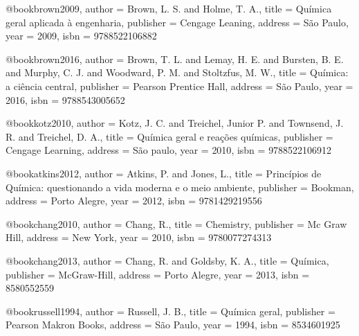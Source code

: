 %

@book{brown2009,
  author = {Brown, L. S. and Holme, T. A.},
  title = {Química geral aplicada à engenharia},
  publisher = {Cengage Leaning},
  address = {São Paulo},
  year = {2009},
  isbn = {9788522106882}
}

@book{brown2016,
  author = {Brown, T. L. and Lemay, H. E. and Bursten, B. E. and Murphy, C. J. and Woodward, P. M. and Stoltzfus, M. W.},
  title = {Química: a ciência central},
  publisher = {Pearson Prentice Hall},
  address = {São Paulo},
  year = {2016},
  isbn = {9788543005652}
}

@book{kotz2010,
  author = {Kotz, J. C. and Treichel, Junior P. and Townsend, J. R. and Treichel, D. A.},
  title = {Química geral e reações químicas},
  publisher = {Cengage Learning},
  address = {São paulo},
  year = {2010},
  isbn = {9788522106912}%
}

@book{atkins2012,
  author = {Atkins, P. and Jones, L.},
  title = {Princípios de Química: questionando a vida moderna e o meio ambiente},
  publisher = {Bookman},
  address = {Porto Alegre},
  year = {2012},
  isbn = {9781429219556}
}

@book{chang2010,
  author = {Chang, R.},
  title = {Chemistry},
  publisher = {Mc Graw Hill},
  address = {New York},
  year = {2010},
  isbn = {9780077274313}
}

@book{chang2013,
  author = {Chang, R. and Goldsby, K. A.},
  title = {Química},
  publisher = {McGraw-Hill},
  address = {Porto Alegre},
  year = {2013},
  isbn = {8580552559}
}

@book{russell1994,
  author = {Russell, J. B.},
  title = {Química geral},
  publisher = {Pearson Makron Books},
  address = {São Paulo},
  year = {1994},
  isbn = {8534601925}%
}

